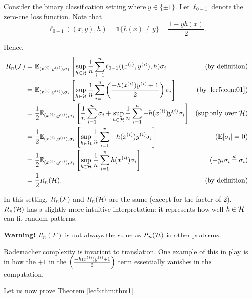 \begin{example}
Consider the binary classification setting where $y \in \{\pm 1\}$. Let $\ell_{0-1}$ denote the zero-one loss function. Note that
\begin{equation}\label{lec5:eqn:01}
    \ell_{0-1}((x,y), h) = \mathbf{1}\{h(x) \neq y\} = \frac{1-yh(x)}{2}.
\end{equation}

Hence,
\begin{align}
    R_n(\mathcal F) &= \mathbb E_{(x^{(i)}, y^{(i)}), \sigma_i} \left[ \sup_{h \in \mathcal H} \frac{1}{n}\sum^n_{i=1} \ell_{0-1}((x^{(i)}, y^{(i)}),h)\sigma_i \right] &(\text{by definition}) \\
    &= \mathbb E_{(x^{(i)}, y^{(i)}), \sigma_i} \left[ \sup_{h \in \mathcal H} \frac{1}{n}\sum^n_{i=1} \left(\frac{-h(x^{(i)})y^{(i)}+1}{2}\right)\sigma_i \right] &(\text{by } \eqref{lec5:eqn:01}) \\
    &= \frac{1}{2} \mathbb E_{(x^{(i)}, y^{(i)}), \sigma_i} \left[ \frac{1}{n}\sum^n_{i=1}\sigma_i + \sup_{h \in \mathcal H} \frac{1}{n}\sum^n_{i=1} -h(x^{(i)})y^{(i)}\sigma_i \right] &(\sup \text{only over } \mathcal H) \\
    &= \frac{1}{2} \mathbb E_{(x^{(i)}, y^{(i)}), \sigma_i} \left[\sup_{h \in \mathcal H} \frac{1}{n}\sum^n_{i=1} -h(x^{(i)})y^{(i)}\sigma_i \right] &(\mathbb E [\sigma_i] = 0) \\
    &=\frac{1}{2} \mathbb E_{(x^{(i)}, y^{(i)}), \sigma_i} \left[\sup_{h \in \mathcal H} \frac{1}{n}\sum^n_{i=1} h(x^{(i)})\sigma_i \right] &(-y_i \sigma_i \stackrel{d}{=} \sigma_i) \\
    &= \frac{1}{2}R_n(\mathcal H). &(\text{by definition})
\end{align}

In this setting, $R_n(\mathcal F)$ and $R_n(\mathcal H)$ are the same (except for the factor of 2). $R_n(\mathcal H)$ has a slightly more intuitive interpretation: it represents how well $h \in \mathcal H$ can fit random patterns.

\textbf{Warning!} $R_n(F)$ is not always the same as $R_n(\mathcal H)$ in other problems.
\end{example}

\begin{remark}
Rademacher complexity is invariant to translation. One example of this in play is in how the $+1$ in the $\left(\frac{-h(x^{(i)})y^{(i)}+1}{2}\right)$ term essentially vanishes in the computation.
\end{remark}

Let us now prove Theorem \ref{lec5:thm:thm1}.

